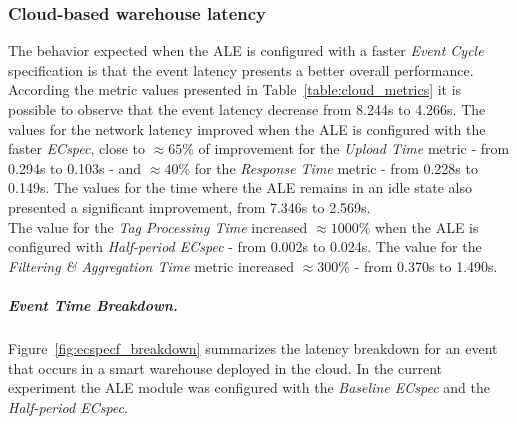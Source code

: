 \subsubsection{Cloud-based warehouse latency}
\label{subs:eval_exp_latency_ecspec_fast}
The behavior expected when the \gls{ALE} is configured with a faster \textit{Event Cycle} specification
is that the event latency presents a better overall performance. According the metric values presented
in Table~\ref{table:cloud_metrics} it is possible to observe that the event latency decrease from 8.244s
to 4.266s. The values for the network latency improved when the \gls{ALE} is configured with the faster
\textit{ECspec}, close to $\approx65\%$ of improvement for the \textit{Upload Time} metric - from 0.294s
to 0.103s - and $\approx40\%$ for the \textit{Response Time} metric - from 0.228s to 0.149s. The
values for the time where the \gls{ALE} remains in an idle state also presented a significant
improvement, from 7.346s to 2.569s.\\



The value for the \textit{Tag Processing Time} increased $\approx1000\%$ when the \gls{ALE} is configured
with \textit{Half-period ECspec} - from 0.002s to 0.024s. The value for the \textit{Filtering \& Aggregation Time}
metric increased $\approx300\%$ - from 0.370s to 1.490s.

\subparagraph{Event Time Breakdown.}
\label{subp:cloud_event_breakdown}
Figure~\ref{fig:ecspecf_breakdown} summarizes the latency breakdown for an event that occurs in a
smart warehouse deployed in the cloud. In the current experiment the \gls{ALE} module was configured with the
\textit{Baseline ECspec} and the \textit{Half-period ECspec}.\\

